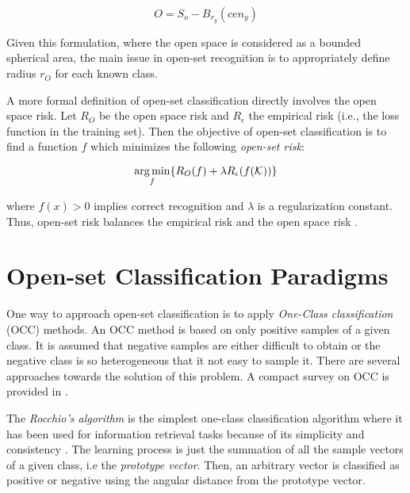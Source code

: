 \begin{equation}\label{chap:eval_methods:eq:openspace_spherical_constrained}
	O = S_{o} - B_{r_{y}}(cen_{y})
\end{equation}

Given this formulation, where the open space is considered as a bounded spherical area, the main issue in open-set recognition is to appropriately define radius $r_O$ for each known class.

A more formal definition of open-set classification directly involves the open space risk. Let $R_{O}$ be the open space risk and $R_{\epsilon}$ the empirical risk (i.e., the loss function in the training set). Then the objective of open-set classification is to find a function $f$ which minimizes the following \textit{open-set risk}: 

\begin{equation}
\operatorname*{arg\,min}_{f} \{R_{O}(f ) + \lambda R_{\epsilon}(f (\mathcal{K}))\}
\end{equation}

\noindent where $f (x) > 0$ implies correct recognition and $\lambda$ is a regularization constant. Thus, open-set risk balances the empirical risk and the open space risk \parencite{geng2018recent}. 

\section{Open-set Classification Paradigms}
\label{chap:openset:sec:Open_Set_Classification_Paradigms}

One way to approach open-set classification is to apply \textit{One-Class classification} (OCC) methods. An OCC method is based on only positive samples of a given class. It is assumed that negative samples are either difficult to obtain or the negative class is so heterogeneous that it not easy to sample it. There are several approaches towards the solution of this problem. A compact survey on OCC is provided in \parencite{khan2010survey}. 

The \textit{Rocchio's algorithm} is the simplest one-class classification algorithm where it has been used for information retrieval tasks because of its simplicity and consistency \parencite{joachims1997probabilistic}. The learning process is just the summation of all the sample vectors of a given class, i.e the \textit{prototype vector}. Then, an arbitrary vector is classified as positive or negative using the angular distance from the prototype vector.

